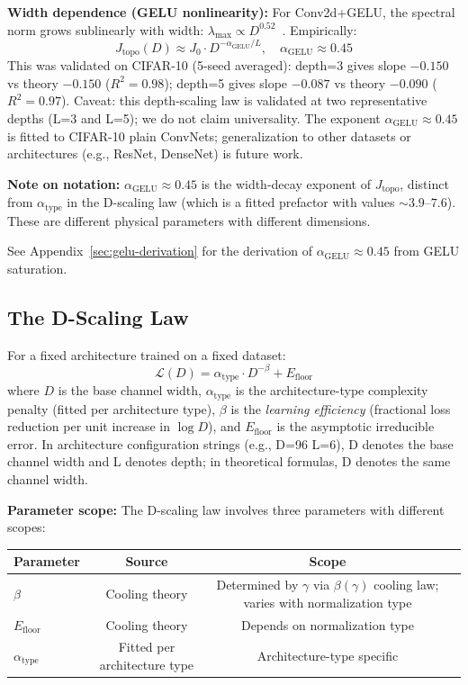 \documentclass[11pt, a4paper]{article}
\theoremstyle{plain}
\begin{document}
\textbf{Width dependence (GELU nonlinearity):} For Conv2d+GELU, the spectral norm grows sublinearly with width: $\lambda_{\max} \propto D^{0.52}$~\citep{hendrycks2016gelu}. Empirically:
\begin{equation}
J_{\mathrm{topo}}(D) \approx J_0 \cdot D^{-\alpha_{\mathrm{GELU}}/L}, \quad \alpha_{\mathrm{GELU}} \approx 0.45
\end{equation}
This was validated on CIFAR-10 (5-seed averaged): depth=3 gives slope $-0.150$ vs theory $-0.150$ ($R^2=0.98$); depth=5 gives slope $-0.087$ vs theory $-0.090$ ($R^2=0.97$). Caveat: this depth-scaling law is validated at two representative depths (L=3 and L=5); we do not claim universality. The exponent $\alpha_{\mathrm{GELU}} \approx 0.45$ is fitted to CIFAR-10 plain ConvNets; generalization to other datasets or architectures (e.g., ResNet, DenseNet) is future work.

\medskip
\noindent\textbf{Note on notation:} $\alpha_{\mathrm{GELU}} \approx 0.45$ is the width-decay exponent of $J_{\mathrm{topo}}$, distinct from $\alpha_{\mathrm{type}}$ in the D-scaling law (which is a fitted prefactor with values $\sim 3.9$--$7.6$). These are different physical parameters with different dimensions.

See Appendix~\ref{sec:gelu-derivation} for the derivation of $\alpha_{\mathrm{GELU}} \approx 0.45$ from GELU saturation.

\subsection{The D-Scaling Law}

For a fixed architecture trained on a fixed dataset:
\begin{equation}
\boxed{\mathcal{L}(D) = \alpha_{\mathrm{type}} \cdot D^{-\beta} + E_{\mathrm{floor}}}
\end{equation}
where $D$ is the base channel width, $\alpha_{\mathrm{type}}$ is the architecture-type complexity penalty (fitted per architecture type), $\beta$ is the \emph{learning efficiency} (fractional loss reduction per unit increase in $\log D$), and $E_{\mathrm{floor}}$ is the asymptotic irreducible error. In architecture configuration strings (e.g., D=96 L=6), D denotes the base channel width and L denotes depth; in theoretical formulas, D denotes the same channel width.

\medskip
\noindent\textbf{Parameter scope:} The D-scaling law involves three parameters with different scopes:
\begin{center}
\begin{tabular}{lccc}
\toprule
Parameter & Source & Scope \\
\midrule
$\beta$ & Cooling theory & Determined by $\gamma$ via $\beta(\gamma)$ cooling law; varies with normalization type \\
$E_{\mathrm{floor}}$ & Cooling theory & Depends on normalization type \\
$\alpha_{\mathrm{type}}$ & Fitted per architecture type & Architecture-type specific \\
\bottomrule
\end{tabular}
\end{center}
\medskip
\end{document}
